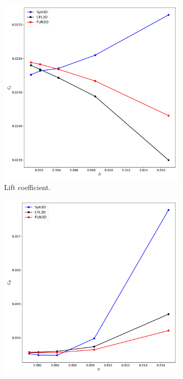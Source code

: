 \begin{figure}[ht!]
\centering
\begin{subfigure}{.45\textwidth}
  \centering
  \includegraphics[width=1.0\textwidth]{figs/2dbump/C_LGridStudy.pdf}
  \caption{Lift coefficient.}
\end{subfigure}%
\begin{subfigure}{.45\textwidth}
  \centering
  \includegraphics[width=1.0\textwidth]{figs/2dbump/C_DGridStudy.pdf}

\end{subfigure}
\end{figure}
